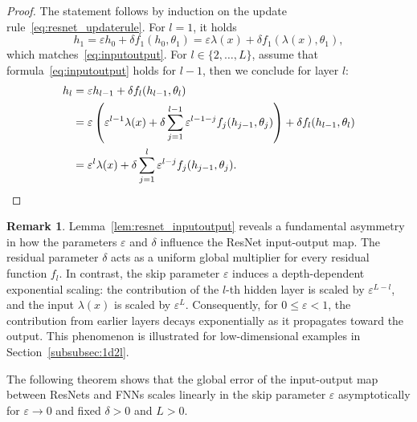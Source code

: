 \documentclass[10pt]{article}
\theoremstyle{definition}
\newtheorem{remark}[theorem]{Remark}
\numberwithin{equation}{section}
\newcommand{\eps}{\varepsilon}
\begin{document}
\begin{proof}
    The statement follows by induction on the update rule~\eqref{eq:resnet_updaterule}. For $l=1$, it holds $$h_1 = \eps h_0 + \delta f_1(h_0,\theta_1) = \eps \lambda(x) + \delta f_1(\lambda(x),\theta_1), $$ which matches~\eqref{eq:inputoutput}. For $l \in \{2,\ldots,L\}$, assume that formula~\eqref{eq:inputoutput} holds for $l-1$, then we conclude for layer $l$:
    \begin{align*}
        h_l &= \eps h_{l-1} + \delta f_l(h_{l-1}, \theta_l) \\
        &= \eps \left( \eps^{l-1} \lambda(x) + \delta \sum_{j = 1}^{l-1} \eps^{l-1-j}f_j(h_{j-1}, \theta_j)\right) + \delta f_l(h_{l-1}, \theta_l) \\
        &= \eps^l \lambda(x) + \delta \sum_{j = 1}^{l} \eps^{l-j}f_j(h_{j-1}, \theta_j). \qedhere
    \end{align*}
\end{proof}

\begin{remark} \label{rem:scaling_asymmetry}
    Lemma~\ref{lem:resnet_inputoutput} reveals a fundamental asymmetry in how the parameters $\eps$ and $\delta$ influence the ResNet input-output map. The residual parameter $\delta$ acts as a uniform global multiplier for every residual function $f_l$. In contrast, the skip parameter $\eps$ induces a depth-dependent exponential scaling: the contribution of the $l$-th hidden layer is scaled by $\eps^{L-l}$, and the input $\lambda(x)$ is scaled by $\eps^L$. 
    Consequently, for $0 \leq \eps < 1$, the contribution from earlier layers decays exponentially as it propagates toward the output.
    This phenomenon is illustrated for low-dimensional examples in Section~\ref{subsubsec:1d2l}.
\end{remark}

The following theorem shows that the global error of the input-output map between ResNets and FNNs scales linearly in the skip parameter $\eps$ asymptotically for $\eps \rightarrow 0$ and fixed $\delta>0$ and $L>0$. %
\end{document}
